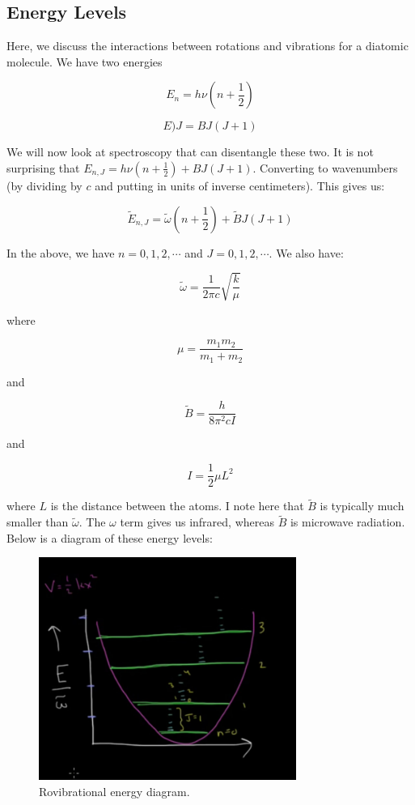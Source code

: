 \documentclass{article}
\newcommand{\be}{\begin{equation}}
\newcommand{\ee}{\end{equation}}
\begin{document}
\subsection{Energy Levels}

Here, we discuss the interactions between rotations and vibrations for a diatomic molecule. We have two energies

\be
E_n = h \nu \left(n + \frac12\right)
\ee

\be
E)J = BJ\left(J+1\right)
\ee

We will now look at spectroscopy that can disentangle these two. It is not surprising that $E_{n,J} = h\nu \left(n + \frac12\right) + BJ\left(J + 1\right)$. Converting to wavenumbers (by dividing by $c$ and putting in units of inverse centimeters). This gives us:

\be
\tilde E _{n,J} = \tilde \omega (n+\frac12) + \tilde B J (J+1)
\ee

In the above, we have $n = 0, 1, 2, \cdots$ and $J = 0, 1, 2, \cdots$. We also have:

\be
\tilde \omega = \frac{1}{2\pi c}\sqrt{\frac{k}{\mu}}
\ee

where

\be
\mu = \frac{m_1 m_2}{m_1 + m_2}
\ee

and 

\be
\tilde B = \frac{h}{8 \pi^2 c I }
\ee

and
 
\be
I = \frac12 \mu L^2
\ee
 
where $L$ is the distance between the atoms. I note here that $\tilde B$ is typically much smaller than $\tilde \omega$. The $\omega$ term gives us infrared, whereas $\tilde B$ is microwave radiation. Below is a diagram of these energy levels:

\begin{figure}
    \centering
    \includegraphics[width=0.75\textwidth]{figures/Screen Shot 2020-09-27 at 6.14.14 PM.png}
    \caption{Rovibrational energy diagram.}
    \label{fig:rovobo}
\end{figure}
\end{document}
